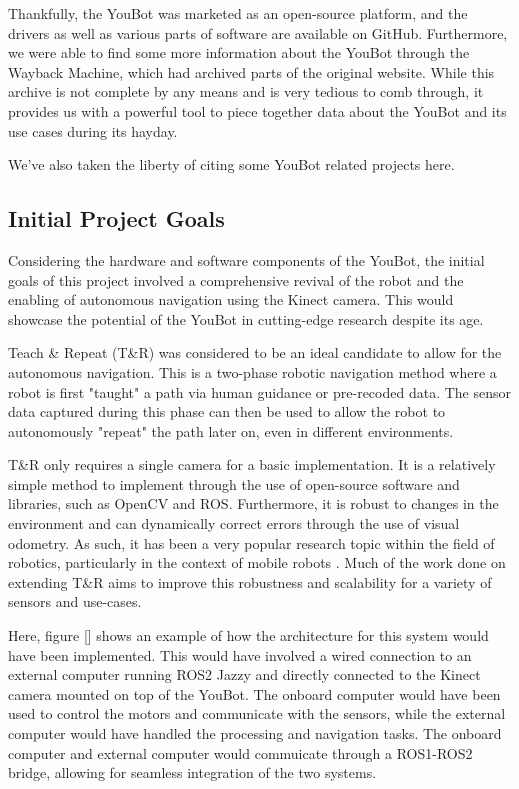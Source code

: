 \documentclass[a4paper, 12pt]{article}
\newif\ifshownotes
\newcommand{\notes}[1]{\ifshownotes\textcolor{blue}{#1}\fi}
\begin{document}
    Thankfully, the YouBot was marketed as an open-source platform, and the drivers as well as various parts of software are available on GitHub. Furthermore, we were able to find some more information about the YouBot through the Wayback Machine, which had archived parts of the original website. While this archive is not complete by any means and is very tedious to comb through, it provides us with a powerful tool to piece together data about the YouBot and its use cases during its hayday.

    We've also taken the liberty of citing some YouBot related projects here.

    \subsection{Initial Project Goals}

    Considering the hardware and software components of the YouBot, the initial goals of this project involved a comprehensive revival of the robot and the enabling of autonomous navigation using the Kinect camera. This would showcase the potential of the YouBot in cutting-edge research despite its age. 

    Teach \& Repeat (T\&R) was considered to be an ideal candidate to allow for the autonomous navigation. This\notes{[cite]} is a two-phase robotic navigation method where a robot is first "taught" a path via human guidance or pre-recoded data. The sensor data captured during this phase can then be used to allow the robot to autonomously "repeat" the path later on, even in different environments.

    T\&R only requires a single camera for a basic implementation. It is a relatively simple method to implement through the use of open-source software and libraries, such as OpenCV and ROS. Furthermore, it is robust to changes in the environment and can dynamically correct errors through the use of visual odometry. As such, it has been a very popular research topic within the field of robotics, particularly in the context of mobile robots \notes{[cite]}. Much of the work done on extending T\&R aims to improve this robustness and scalability for a variety of sensors and use-cases. 

    \notes{some sort of flow diagram showing how everything would be connected, the ros stack would look like.}

    Here, figure [] shows an example of how the architecture for this system would have been implemented. This would have involved a wired connection to an external computer running ROS2 Jazzy and directly connected to the Kinect camera mounted on top of the YouBot. The onboard computer would have been used to control the motors and communicate with the sensors, while the external computer would have handled the processing and navigation tasks. The onboard computer and external computer would commuicate through a ROS1-ROS2 bridge, allowing for seamless integration of the two systems. 
\end{document}
